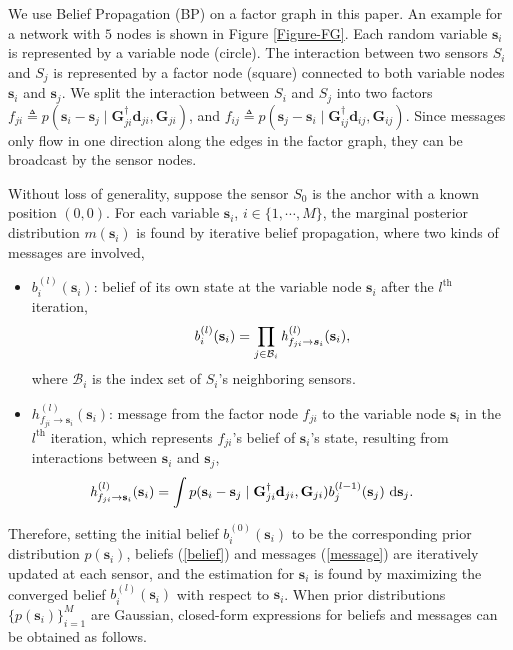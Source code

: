 \documentclass[10pt, twocolumn, final]{IEEEtran}
\begin{document}
We use Belief Propagation (BP) on a factor graph\cite{Kschischang2001} in this paper. An example for a network with $5$ nodes is shown in Figure \ref{Figure-FG}. Each random variable $\mathbf{s}_i$ is represented by a variable node (circle). The interaction between two sensors $S_i$ and $S_j$ is represented by a factor node (square) connected to both variable nodes $\mathbf{s}_i$ and $\mathbf{s}_j$. We split the interaction between $S_i$ and $S_j$ into two factors $f_{ji} \triangleq p(\mathbf{s}_i - \mathbf{s}_j \mid \mathbf{G}_{ji}^{\dagger}\mathbf{d}_{ji}, \mathbf{G}_{ji})$, and $f_{ij} \triangleq p(\mathbf{s}_j - \mathbf{s}_i \mid \mathbf{G}_{ij}^{\dagger}\mathbf{d}_{ij}, \mathbf{G}_{ij})$. Since messages only flow in one direction along the edges in the factor graph, they can be broadcast by the sensor nodes.

Without loss of generality, suppose the sensor $S_0$ is the anchor with a known position $(0, 0)$. For each variable $\mathbf{s}_i$, $i \in \{1, \cdots, M\}$, the marginal posterior distribution $m(\mathbf{s}_i)$ is found by iterative belief propagation, where two kinds of messages are involved,
\begin{itemize}
\item{$\mathit{b}^{(l)}_i(\mathbf{s}_i)$: belief of its own state at the variable node $\mathbf{s}_i$ after the $l^{\mathrm{th}}$ iteration,
\begin{align}
\setcounter{equation}{7}
\mathit{b}^{(l)}_i(\mathbf{s}_i) = \prod_{j \in \mathcal{B}_i}{\mathit{h}^{(l)}_{f_{ji} \rightarrow \bm{s}_i}(\mathbf{s}_i)}, \label{belief}
\end{align}
where $\mathcal{B}_i$ is the index set of $S_i$'s neighboring sensors.}
\item{$\mathit{h}^{(l)}_{f_{ji} \rightarrow \mathbf{s}_i}(\mathbf{s}_i)$: message from the factor node $f_{ji}$ to the variable node $\mathbf{s}_i$ in the $l^{\mathrm{th}}$ iteration, which represents $f_{ji}$'s belief of $\mathbf{s}_i$'s state, resulting from interactions between $\mathbf{s}_i$ and $\mathbf{s}_j$,
\begin{align}
\hspace{-1cm} \mathit{h}^{(l)}_{f_{ji} \rightarrow \mathbf{s}_i}(\mathbf{s}_i) = \int p(\mathbf{s}_i - \mathbf{s}_j \mid \mathbf{G}_{ji}^{\dagger}\mathbf{d}_{ji}, \mathbf{G}_{ji}) b^{(l-1)}_j(\mathbf{s}_j) \ \mathrm{d} \mathbf{s}_j. \label{message}
\end{align}}
\end{itemize}
Therefore, setting the initial belief $\mathit{b}^{(0)}_i(\mathbf{s}_i)$ to be the corresponding prior distribution $p(\mathbf{s}_i)$, beliefs (\ref{belief}) and messages (\ref{message}) are iteratively updated at each sensor, and the estimation for $\mathbf{s}_i$ is found by maximizing the converged belief $b^{(l)}_i(\mathbf{s}_i)$ with respect to $\mathbf{s}_i$. When prior distributions $\{p(\mathbf{s}_i)\}_{i=1}^{M}$ are Gaussian, closed-form expressions for beliefs and messages can be obtained as follows.
\end{document}
